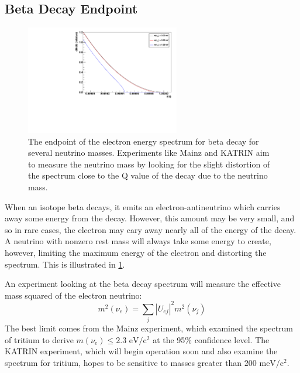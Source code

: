 \documentclass[herrin-thesis.tex]{subfiles}
\begin{document}
\subsection{Beta Decay Endpoint}
\begin{figure}
	\centering
	\includegraphics[width=0.6\textwidth]{./plots/nu_beta_endpt.pdf}
	\caption[Beta decay spectrum endpoint for massive neutrinos]{The endpoint of the electron energy spectrum for beta decay for several neutrino masses. Experiments like Mainz and KATRIN aim to measure the neutrino mass by looking for the slight distortion of the spectrum close to the Q value of the decay due to the neutrino mass.}
	\label{fig:nu_beta_endpt}
\end{figure}

When an isotope beta decays, it emits an electron-antineutrino which carries away some energy from the decay. However, this amount may be very small, and so in rare cases, the electron may cary away nearly all of the energy of the decay. A neutrino with nonzero rest mass will always take some energy to create, however, limiting the maximum energy of the electron and distorting the spectrum. This is illustrated in \cref{fig:nu_beta_endpt}.

An experiment looking at the beta decay spectrum will measure the effective mass squared of the electron neutrino:
\begin{equation}
m^2\left(\nu_e\right) = \sum_j \left | U_{e j} \right |^2 m^2\left(\nu_j\right)
\label{eq:nu_beta_endpt_mass}
\end{equation}
The best limit comes from the Mainz experiment, which examined the spectrum of tritium to derive \(m(\nu_e) \leq 2.3 \text{ eV}/\text{c}^{2}\) at the 95\% confidence level\cite{Kraus:2005nx}. The KATRIN experiment, which will begin operation soon and also examine the spectrum for tritium, hopes to be sensitive to masses greater than \(200\text{ meV}/\text{c}^2\)\cite{Osipowicz:2001oq}.
\end{document}
